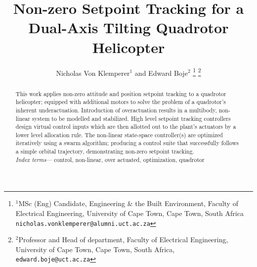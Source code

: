\documentclass[a4paper, 10pt, conference]{ieeeconf}
\title{\LARGE \bf
Non-zero Setpoint Tracking for a Dual-Axis Tilting Quadrotor Helicopter
}
\author{Nicholas Von Klemperer$^{1}$ and Edward Boje$^{2}$%
\thanks{$^{1}$MSc (Eng) Candidate, Engineering \& the Built Environment, Faculty of Electrical Engineering, University of Cape Town, Cape Town, South Africa
{\tt\small nicholas.vonklemperer@alumni.uct.ac.za}}
\thanks{$^{2}$Professor and Head of department, Faculty of Electrical Engineering, University of Cape Town, Cape Town, South Africa,
        {\tt\small edward.boje@uct.ac.za}}%
}
\begin{document}
\maketitle
\thispagestyle{empty}
\pagestyle{empty}
\begin{abstract}
This work applies non-zero attitude and position setpoint tracking to a quadrotor helicopter; equipped with additional motors to solve the problem of a quadrotor's inherent underactuation. Introduction of overactuation results in a multibody, non-linear system to be modelled and stabilized. High level setpoint tracking controllers design virtual control inputs which are then allotted out to the plant's actuators by a lower level allocation rule. The non-linear state-space controller(s) are optimized iteratively using a swarm algorithm; producing a control suite that successfully follows a simple orbital trajectory, demonstrating non-zero setpoint tracking.
\\
\emph{Index terms}--- control, non-linear, over actuated, optimization, quadrotor
\end{abstract}
\end{document}
